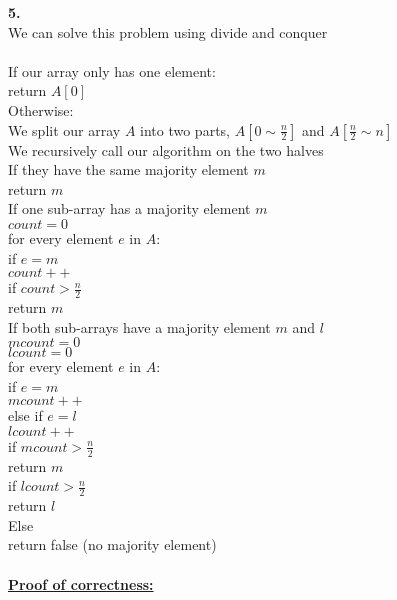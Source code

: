\documentclass[10pt, letterpaper]{report}
\newcommand\tab[1][1cm]{\hspace*{#1}}
\begin{document}
\newpage
\noindent \large{\textbf{5.} } \\
We can solve this problem using divide and conquer\\
\\
If our array only has one element:\\
\tab return $A[0]$\\
Otherwise:\\
\tab We split our array $A$ into two parts, \(A[0 \sim \frac{n}{2}]\) and \(A[\frac{n}{2} \sim n]\)\\
\tab We recursively call our algorithm on the two halves\\
\tab If they have the same majority element $m$\\
\tab\tab return $m$\\
\tab If one sub-array has a majority element $m$\\
\tab\tab $count = 0$\\
\tab\tab for every element $e$ in $A$:\\
\tab\tab\tab if $e = m$\\
\tab\tab\tab\tab $count++$\\
\tab\tab if $count > \frac{n}{2}$\\
\tab\tab\tab return $m$\\
\tab If both sub-arrays have a majority element $m$ and $l$\\
\tab\tab $mcount = 0$\\
\tab\tab $lcount = 0$\\
\tab\tab for every element $e$ in $A$:\\
\tab\tab\tab if $e = m$\\
\tab\tab\tab\tab $mcount++$\\
\tab\tab\tab else if $e = l$\\
\tab\tab\tab\tab $lcount++$\\
\tab\tab if $mcount > \frac{n}{2}$\\
\tab\tab\tab return $m$\\
\tab\tab if $lcount > \frac{n}{2}$\\
\tab\tab\tab return $l$\\
\tab Else\\
\tab\tab return false (no majority element)\\
\\
\textbf{\underline{Proof of correctness:}}\\
\end{document}
